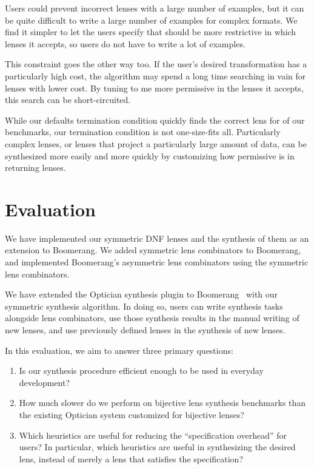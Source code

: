 \documentclass[acmsmall,screen,anonymous]{acmart}
\begin{document}
Users could prevent incorrect lenses with a large number of examples, but it can
be quite difficult to write a large number of examples for complex formats. We
find it simpler to let the users specify that \RXSearch should be more
restrictive in which lenses it accepts, so users do not have to write a lot of
examples.

This constraint goes the other way too. If the user's desired transformation has
a particularly high cost, the algorithm may spend a long time searching in vain
for lenses with lower cost. By tuning \RXSearch to me more permissive in the
lenses it accepts, this search can be short-circuited.

While our defaults termination condition quickly finds the correct lens for
 of our  benchmarks, our termination condition is not
one-size-fits all. Particularly complex lenses, or lenses that project a
particularly large amount of data, can be synthesized more easily and more
quickly by customizing how permissive \RXSearch is in returning lenses.

\section{Evaluation}
\label{sec:evaluation}
We have implemented our symmetric DNF lenses and the synthesis of them as an
extension to Boomerang. We added symmetric lens combinators to Boomerang, and
implemented Boomerang's asymmetric lens combinators  using the symmetric lens combinators.

We have extended the Optician synthesis plugin to Boomerang~\cite{?} with our
symmetric synthesis algorithm. In doing so, users can write synthesis tasks
alongside lens combinators, use those synthesis results in the manual writing of
new lenses, and use previously defined lenses in the synthesis of new lenses.

In this evaluation, we aim to answer three primary questions:
\begin{enumerate}
\item Is our synthesis procedure efficient enough to be used in everyday
  development?

\item How much slower do we perform on bijective lens synthesis benchmarks than
  the existing Optician system customized for bijective lenses?
  
\item Which heuristics are useful for reducing the ``specification
  overhead'' for users? In particular, which heuristics are useful in
  synthesizing the desired lens, instead of merely a lens that satisfies the
  specification?
\end{enumerate}
\end{document}
